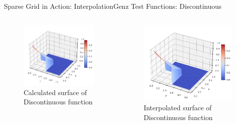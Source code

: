 \begin{frame}{Sparse Grid in Action: Interpolation}{Genz Test Functions: Discontinuous}
    \begin{columns}
        \begin{column}{0.5\textwidth}
            \begin{figure}
                \centering
                \includegraphics[width=.8\textwidth]{figures/disco.pdf}
                \caption{Calculated surface of Discontinuous function}
            \end{figure}
        \end{column}
        \begin{column}{0.5\textwidth}
            \begin{figure}
                \centering
                \includegraphics[width=.8\textwidth]{figures/SurfacePlot_disco.pdf}
                \caption{Interpolated surface of Discontinuous function}
            \end{figure}
        \end{column}
    \end{columns}
\end{frame}

